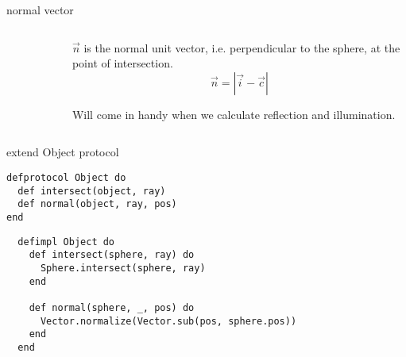 \begin{frame}[fragile]{normal vector}


\begin{columns}
 \begin{column}{0.4\linewidth}
\begin{figure}
\end{figure}
 \end{column}
\pause
 \begin{column}{0.6\linewidth}
$\vec{n}$ is the normal unit vector, i.e. perpendicular to the sphere, at the point of intersection.
  $$\vec{n} = |\vec{i} - \vec{c}|$$
\pause 

Will come in handy when we calculate reflection and illumination.

 \end{column}
\end{columns}

\end{frame}

\begin{frame}[fragile]{extend Object protocol}
\begin{verbatim}
defprotocol Object do
  def intersect(object, ray)
  def normal(object, ray, pos) 
end
\end{verbatim}
\vspace{10pt}\pause
\begin{verbatim}
  defimpl Object do                    
    def intersect(sphere, ray) do
      Sphere.intersect(sphere, ray)
    end

    def normal(sphere, _, pos) do
      Vector.normalize(Vector.sub(pos, sphere.pos))
    end
  end
\end{verbatim}

\end{frame}



